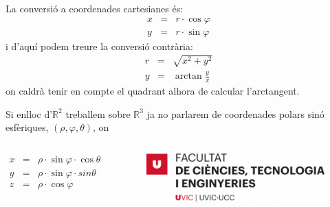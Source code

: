 \documentclass{beamer}
\begin{document}
\begin{frame}
  La conversió a coordenades cartesianes és:
  \begin{eqnarray*}
    x&=& r \cdot \cos{\varphi}\\
    y&=& r \cdot \sin{\varphi}
  \end{eqnarray*}
  i d'aquí podem treure la conversió contrària:
  \begin{eqnarray*}
    r&=& \sqrt{x^2+y^2}\\
    y&=& \arctan{\frac{y}{x}}
  \end{eqnarray*}
  on caldrà tenir en compte el quadrant alhora de calcular l'arctangent.

\end{frame}

\begin{frame}
  Si enlloc d'$\mathbb{R}^2$ treballem sobre $\mathbb{R}^3$ ja no parlarem de coordenades polars sinó esfèriques, $(\rho,\varphi,\theta)$, on
  \begin{columns}[c]
  \begin{eqnarray*}
    x&=& \rho \cdot \sin{\varphi} \cdot \cos{\theta}\\
    y&=& \rho \cdot \sin{\varphi} \cdot sin{\theta}\\
    z&=& \rho \cdot \cos{\varphi}
  \end{eqnarray*}
  \begin{figure}
    \includegraphics[width=\linewidth]{FCTE}
  \end{figure}
\end{columns}

\end{frame}
\end{document}
